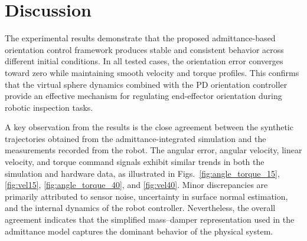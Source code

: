 \documentclass[journal]{IEEEtran}
\begin{document}

\section{Discussion}
\label{sec:discussion}

The experimental results demonstrate that the proposed admittance-based orientation control framework produces stable and consistent behavior across different initial conditions. In all tested cases, the orientation error converges toward zero while maintaining smooth velocity and torque profiles. This confirms that the virtual sphere dynamics combined with the PD orientation controller provide an effective mechanism for regulating end-effector orientation during robotic inspection tasks.

A key observation from the results is the close agreement between the synthetic trajectories obtained from the admittance-integrated simulation and the measurements recorded from the robot. The angular error, angular velocity, linear velocity, and torque command signals exhibit similar trends in both the simulation and hardware data, as illustrated in Figs.~\ref{fig:angle_torque_15}, \ref{fig:vel15}, \ref{fig:angle_torque_40}, and \ref{fig:vel40}. Minor discrepancies are primarily attributed to sensor noise, uncertainty in surface normal estimation, and the internal dynamics of the robot controller. Nevertheless, the overall agreement indicates that the simplified mass–damper representation used in the admittance model captures the dominant behavior of the physical system.
\end{document}
